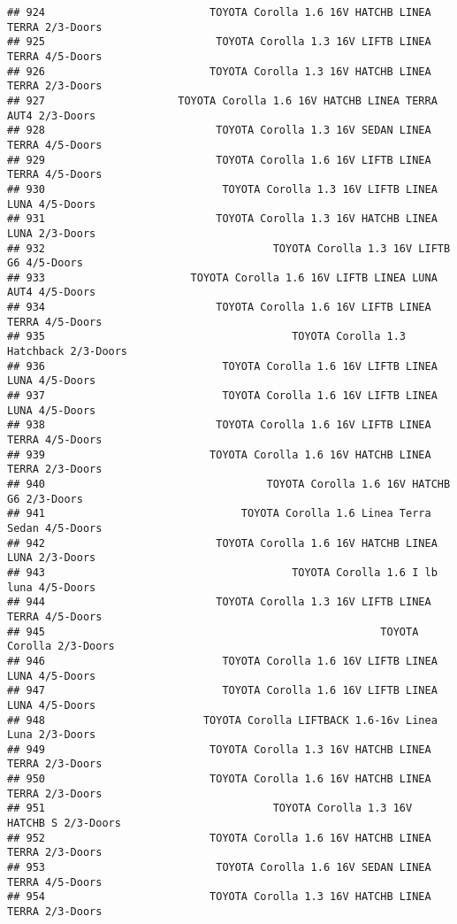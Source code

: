 \documentclass[]{article}
\begin{document}
\begin{verbatim}
## 924                          TOYOTA Corolla 1.6 16V HATCHB LINEA TERRA 2/3-Doors
## 925                           TOYOTA Corolla 1.3 16V LIFTB LINEA TERRA 4/5-Doors
## 926                          TOYOTA Corolla 1.3 16V HATCHB LINEA TERRA 2/3-Doors
## 927                     TOYOTA Corolla 1.6 16V HATCHB LINEA TERRA AUT4 2/3-Doors
## 928                           TOYOTA Corolla 1.3 16V SEDAN LINEA TERRA 4/5-Doors
## 929                           TOYOTA Corolla 1.6 16V LIFTB LINEA TERRA 4/5-Doors
## 930                            TOYOTA Corolla 1.3 16V LIFTB LINEA LUNA 4/5-Doors
## 931                           TOYOTA Corolla 1.3 16V HATCHB LINEA LUNA 2/3-Doors
## 932                                    TOYOTA Corolla 1.3 16V LIFTB G6 4/5-Doors
## 933                       TOYOTA Corolla 1.6 16V LIFTB LINEA LUNA AUT4 4/5-Doors
## 934                           TOYOTA Corolla 1.6 16V LIFTB LINEA TERRA 4/5-Doors
## 935                                       TOYOTA Corolla 1.3 Hatchback 2/3-Doors
## 936                            TOYOTA Corolla 1.6 16V LIFTB LINEA LUNA 4/5-Doors
## 937                            TOYOTA Corolla 1.6 16V LIFTB LINEA LUNA 4/5-Doors
## 938                           TOYOTA Corolla 1.6 16V LIFTB LINEA TERRA 4/5-Doors
## 939                          TOYOTA Corolla 1.6 16V HATCHB LINEA TERRA 2/3-Doors
## 940                                   TOYOTA Corolla 1.6 16V HATCHB G6 2/3-Doors
## 941                               TOYOTA Corolla 1.6 Linea Terra Sedan 4/5-Doors
## 942                           TOYOTA Corolla 1.6 16V HATCHB LINEA LUNA 2/3-Doors
## 943                                       TOYOTA Corolla 1.6 I lb luna 4/5-Doors
## 944                           TOYOTA Corolla 1.3 16V LIFTB LINEA TERRA 4/5-Doors
## 945                                                     TOYOTA Corolla 2/3-Doors
## 946                            TOYOTA Corolla 1.6 16V LIFTB LINEA LUNA 4/5-Doors
## 947                            TOYOTA Corolla 1.6 16V LIFTB LINEA LUNA 4/5-Doors
## 948                         TOYOTA Corolla LIFTBACK 1.6-16v Linea Luna 2/3-Doors
## 949                          TOYOTA Corolla 1.3 16V HATCHB LINEA TERRA 2/3-Doors
## 950                          TOYOTA Corolla 1.6 16V HATCHB LINEA TERRA 2/3-Doors
## 951                                    TOYOTA Corolla 1.3 16V HATCHB S 2/3-Doors
## 952                          TOYOTA Corolla 1.6 16V HATCHB LINEA TERRA 2/3-Doors
## 953                           TOYOTA Corolla 1.6 16V SEDAN LINEA TERRA 4/5-Doors
## 954                          TOYOTA Corolla 1.3 16V HATCHB LINEA TERRA 2/3-Doors

\end{verbatim}
\end{document}
